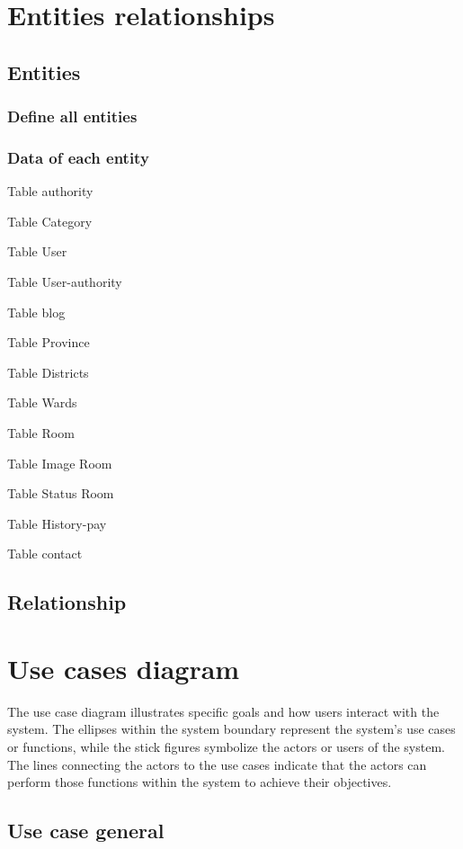 \documentclass[../Main.tex]{subfiles}
\begin{document}
\section{Entities relationships}

\subsection{Entities}

\subsubsection{Define all entities}

\subsubsection{Data of each entity}

Table authority

Table Category

Table User

Table User-authority

Table blog

Table Province

Table Districts

Table Wards

Table Room

Table Image Room

Table Status Room

Table History-pay

Table contact

\subsection{Relationship}

\section{Use cases diagram}

The use case diagram illustrates specific goals and how users interact with the system.
The ellipses within the system boundary represent the system's use cases or functions, while the stick figures symbolize the actors or users of the system.
The lines connecting the actors to the use cases indicate that the actors can perform those functions within the system to achieve their objectives.

\subsection{Use case general}
\end{document}
